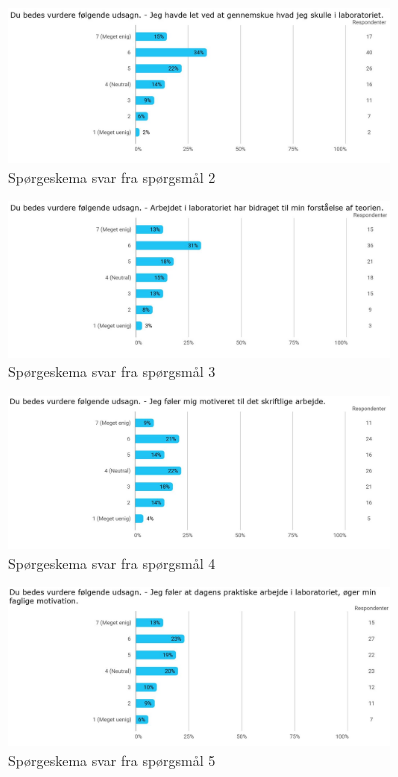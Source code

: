 \begin{figure}[h!]
	\centering
	\includegraphics[width=0.9\textwidth]{Figs/Sp2}
	\caption{Spørgeskema svar fra spørgsmål 2}
	\label{fig:4.1.c}
\end{figure}

\begin{figure}[h!]
	\centering
	\includegraphics[width=0.9\textwidth]{Figs/Sp3}
	\caption{Spørgeskema svar fra spørgsmål 3}
	\label{fig:4.1.d}
\end{figure}

\begin{figure}[h!]
	\centering
	\includegraphics[width=0.9\textwidth]{Figs/Sp4}
	\caption{Spørgeskema svar fra spørgsmål 4}
	\label{fig:4.1.e}
\end{figure}

\begin{figure}[h!]
	\centering
	\includegraphics[width=0.9\textwidth]{Figs/Sp5}
	\caption{Spørgeskema svar fra spørgsmål 5}
	\label{fig:4.1.f}
\end{figure}

